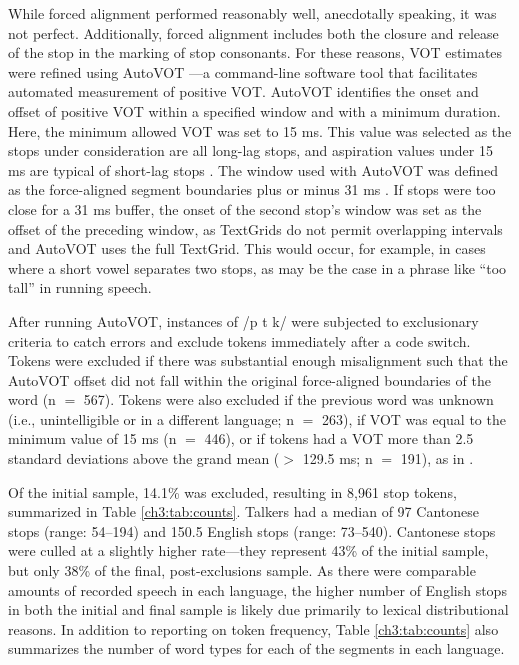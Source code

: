While forced alignment performed reasonably well, anecdotally speaking, it was not perfect. Additionally, forced alignment includes both the closure and release of the stop in the marking of stop consonants. For these reasons, VOT estimates were refined using AutoVOT \citep{keshet_2014_autovot}---a command-line software tool that facilitates automated measurement of positive VOT. AutoVOT identifies the onset and offset of positive VOT within a specified window and with a minimum duration. Here, the minimum allowed VOT was set to 15 ms. This value was selected as the stops under consideration are all long-lag stops, and aspiration values under 15 ms are typical of short-lag stops \citep{lieberman_1988_speech}. The window used with AutoVOT was defined as the force-aligned segment boundaries plus or minus 31 ms \citep[as recommended by][]{chodroff_2017_structure}. If stops were too close for a 31 ms buffer, the onset of the second stop's window was set as the offset of the preceding window, as TextGrids do not permit overlapping intervals and AutoVOT uses the full TextGrid. This would occur, for example, in cases where a short vowel separates two stops, as may be the case in a phrase like ``too tall'' in running speech.

After running AutoVOT, instances of /p t k/ were subjected to exclusionary criteria to catch errors and exclude tokens immediately after a code switch. Tokens were excluded if there was substantial enough misalignment such that the AutoVOT offset did not fall within the original force-aligned boundaries of the word (n $=$ 567). Tokens were also excluded if the previous word was unknown (i.e., unintelligible or in a different language; n $=$ 263), if VOT was equal to the minimum value of 15 ms (n $=$ 446), or if tokens had a VOT more than 2.5 standard deviations above the grand mean ($>$ 129.5 ms; n $=$ 191), as in \citet{chodroff_2017_structure}.

Of the initial sample, 14.1\% was excluded, resulting in 8,961 stop tokens, summarized in Table \ref{ch3:tab:counts}. Talkers had a median of 97 Cantonese stops (range: 54--194) and 150.5 English stops (range: 73--540). Cantonese stops were culled at a slightly higher rate---they represent 43\% of the initial sample, but only 38\% of the final, post-exclusions sample. As there were comparable amounts of recorded speech in each language, the higher number of English stops in both the initial and final sample is likely due primarily to lexical distributional reasons. In addition to reporting on token frequency, Table \ref{ch3:tab:counts} also summarizes the number of word types for each of the segments in each language. 

